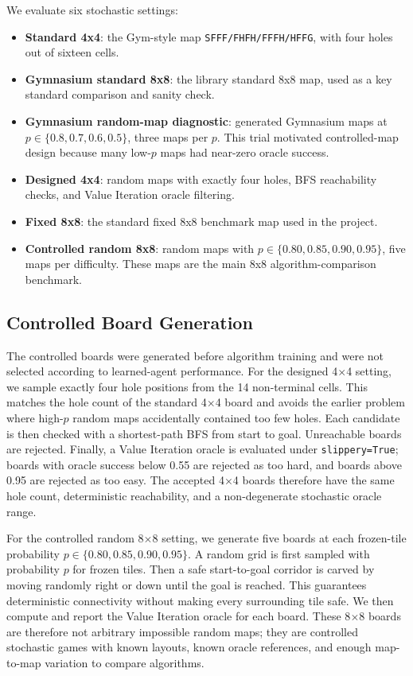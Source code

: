 \documentclass[10pt]{article}
\begin{document}
We evaluate six stochastic settings:
\begin{itemize}
    \item \textbf{Standard 4x4}: the Gym-style map \texttt{SFFF/FHFH/FFFH/HFFG}, with four holes out of sixteen cells.
    \item \textbf{Gymnasium standard 8x8}: the library standard 8x8 map, used as a key standard comparison and sanity check.
    \item \textbf{Gymnasium random-map diagnostic}: generated Gymnasium maps at $p\in\{0.8,0.7,0.6,0.5\}$, three maps per $p$. This trial motivated controlled-map design because many low-$p$ maps had near-zero oracle success.
    \item \textbf{Designed 4x4}: random maps with exactly four holes, BFS reachability checks, and Value Iteration oracle filtering.
    \item \textbf{Fixed 8x8}: the standard fixed 8x8 benchmark map used in the project.
    \item \textbf{Controlled random 8x8}: random maps with $p\in\{0.80,0.85,0.90,0.95\}$, five maps per difficulty. These maps are the main 8x8 algorithm-comparison benchmark.
\end{itemize}

\subsection{Controlled Board Generation}
The controlled boards were generated before algorithm training and were not selected according to learned-agent performance. For the designed 4$\times$4 setting, we sample exactly four hole positions from the 14 non-terminal cells. This matches the hole count of the standard 4$\times$4 board and avoids the earlier problem where high-$p$ random maps accidentally contained too few holes. Each candidate is then checked with a shortest-path BFS from start to goal. Unreachable boards are rejected. Finally, a Value Iteration oracle is evaluated under \texttt{slippery=True}; boards with oracle success below 0.55 are rejected as too hard, and boards above 0.95 are rejected as too easy. The accepted 4$\times$4 boards therefore have the same hole count, deterministic reachability, and a non-degenerate stochastic oracle range.

For the controlled random 8$\times$8 setting, we generate five boards at each frozen-tile probability $p\in\{0.80,0.85,0.90,0.95\}$. A random grid is first sampled with probability $p$ for frozen tiles. Then a safe start-to-goal corridor is carved by moving randomly right or down until the goal is reached. This guarantees deterministic connectivity without making every surrounding tile safe. We then compute and report the Value Iteration oracle for each board. These 8$\times$8 boards are therefore not arbitrary impossible random maps; they are controlled stochastic games with known layouts, known oracle references, and enough map-to-map variation to compare algorithms.
\end{document}
